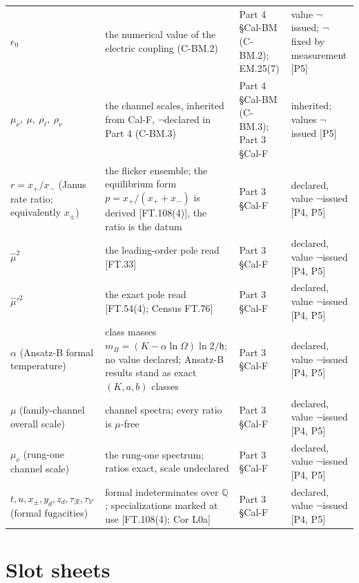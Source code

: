 \documentclass[11pt,openany]{report}
\theoremstyle{canonplain}
\theoremstyle{canondef}
\begin{document}
\begin{longtable}{@{}p{}p{}p{}p{}@{}}
$e_0$ & the numerical value of the electric coupling (C-BM.2) & Part 4 §Cal-BM (C-BM.2); EM.25(7) & value $\neg$issued; $\neg$fixed by measurement [P5] \\
$\mu_\nu,\ \mu,\ \rho_\ell,\ \rho_\nu$ & the channel scales, inherited from Cal-F, $\neg$declared in Part 4 (C-BM.3) & Part 4 §Cal-BM (C-BM.3); Part 3 §Cal-F & inherited; values $\neg$issued [P5] \\
$r=x_+/x_-$ (Janus rate ratio; equivalently $x_\pm$) & the flicker ensemble; the equilibrium form $p=x_+/(x_++x_-)$ is derived [FT.108(4)], the ratio is the datum & Part 3 §Cal-F & declared, value $\neg$issued [P4, P5] \\
$\hat\mu^2$ & the leading-order pole read [FT.33] & Part 3 §Cal-F & declared, value $\neg$issued [P4, P5] \\
$\hat\mu'^2$ & the exact pole read [FT.54(4); Census FT.76] & Part 3 §Cal-F & declared, value $\neg$issued [P4, P5] \\
$\alpha$ (Ansatz-B formal temperature) & class masses $m_B=(K-\alpha\ln\Omega)\ln2/\mathfrak h$; no value declared; Ansatz-B results stand as exact $(K,a,b)$ classes & Part 3 §Cal-F & declared, value $\neg$issued [P4, P5] \\
$\mu$ (family-channel overall scale) & channel spectra; every ratio is $\mu$-free & Part 3 §Cal-F & declared, value $\neg$issued [P4, P5] \\
$\mu_\nu$ (rung-one channel scale) & the rung-one spectrum; ratios exact, scale undeclared & Part 3 §Cal-F & declared, value $\neg$issued [P4, P5] \\
$t,u,x_\pm,y_d,z_d,\tau_{\mathcal R},\tau_{\mathcal V}$ (formal fugacities) & formal indeterminates over $\mathbb Q$; specializations marked at use [FT.108(4); Cor L0a] & Part 3 §Cal-F & declared, value $\neg$issued [P4, P5] \\
\bottomrule
\end{longtable}
\endgroup
\section*{\texorpdfstring{Slot sheets}{Slot sheets}}
\end{document}
